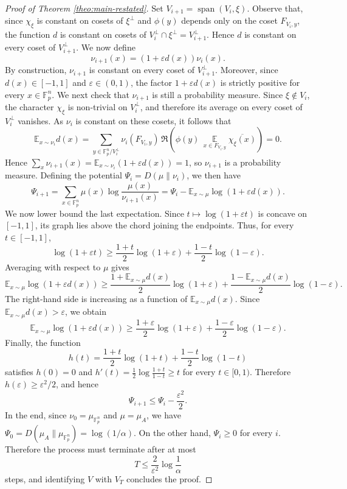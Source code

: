 \documentclass[11pt,reqno]{amsart}
\theoremstyle{plain}
\theoremstyle{remark}
\begin{document}
\begin{proof}[Proof of Theorem \ref{theo:main-restated}]
Set $V_{i+1}=\operatorname{span}(V_i,\xi)$. Observe that, since $\chi_\xi$ is constant on cosets of $\xi^\perp$ and $\phi(y)$ depends only on the coset $F_{V_i,y}$, the function $d$ is constant on cosets of $V_i^\perp\cap \xi^\perp = V_{i+1}^\perp$. Hence $d$ is constant on every coset of $V_{i+1}^\perp$. We now define
$$
\nu_{i+1}(x)=(1+\varepsilon d(x))\nu_i(x).
$$
By construction, $\nu_{i+1}$ is constant on every coset of $V_{i+1}^\perp$. Moreover, since $d(x)\in[-1,1]$ and $\varepsilon\in(0,1)$, the factor $1+\varepsilon d(x)$ is strictly positive for every $x\in\mathbb F_p^n$.
We next check that $\nu_{i+1}$ is still a probability measure. Since $\xi\notin V_i$, the character $\chi_\xi$ is non-trivial on $V_i^\perp$, and therefore its average on every coset of $V_i^\perp$ vanishes. As $\nu_i$ is constant on these cosets, it follows that
$$
\mathbb E_{x\sim\nu_i} d(x)
=
\sum_{y\in \mathbb F_p^n/V_i^\perp}
\nu_i(F_{V_i,y})\,
\Re\left(
\phi(y)\,
\mathop{\mathbb E}\limits_{x\in F_{V_i,y}} \overline{\chi_\xi(x)}
\right)
=
0.
$$
Hence $\sum_x \nu_{i+1}(x)=\mathbb E_{x\sim\nu_i}(1+\varepsilon d(x))=1$, so $\nu_{i+1}$ is a probability measure.
Defining the potential $\Psi_i=D(\mu\|\nu_i)$, we then have
$$
\Psi_{i+1}
=
\sum_{x\in\mathbb F_p^n}
\mu(x)\log\frac{\mu(x)}{\nu_{i+1}(x)}
=
\Psi_i-\mathbb E_{x\sim\mu}\log(1+\varepsilon d(x)).
$$
We now lower bound the last expectation. Since $t\mapsto\log(1+\varepsilon t)$ is concave on $[-1,1]$, its graph lies above the chord joining the endpoints. Thus, for every $t\in[-1,1]$,
$$
\log(1+\varepsilon t)
\geq
\frac{1+t}{2}\log(1+\varepsilon)
+
\frac{1-t}{2}\log(1-\varepsilon).
$$
Averaging with respect to $\mu$ gives
$$
\mathbb E_{x\sim\mu}\log(1+\varepsilon d(x))
\geq
\frac{1+\mathbb E_{x\sim\mu}d(x)}{2}\log(1+\varepsilon)
+
\frac{1-\mathbb E_{x\sim\mu}d(x)}{2}\log(1-\varepsilon).
$$
The right-hand side is increasing as a function of $\mathbb E_{x\sim\mu}d(x)$. Since $\mathbb E_{x\sim\mu}d(x)>\varepsilon$, we obtain
$$
\mathbb E_{x\sim\mu}\log(1+\varepsilon d(x))
\geq
\frac{1+\varepsilon}{2}\log(1+\varepsilon)
+
\frac{1-\varepsilon}{2}\log(1-\varepsilon).
$$
Finally, the function
$$
h(t)=\frac{1+t}{2}\log(1+t)+\frac{1-t}{2}\log(1-t)
$$
satisfies $h(0)=0$ and $h'(t)=\frac12\log\frac{1+t}{1-t}\geq t$ for every $t\in[0,1)$. Therefore $h(\varepsilon)\geq \varepsilon^2/2$, and hence
$$
\Psi_{i+1}\leq \Psi_i-\frac{\varepsilon^2}{2}.
$$
In the end, since $\nu_0=\mu_{\mathbb F_p^n}$ and $\mu=\mu_A$, we have $\Psi_0=D(\mu_A\|\mu_{\mathbb F_p^n})=\log(1/\alpha)$. On the other hand, $\Psi_i\geq0$ for every $i$. Therefore the process must terminate after at most
$$
T\leq \frac{2}{\varepsilon^2}\log\frac{1}{\alpha}
$$
steps, and identifying $V$ with $V_T$ concludes the proof.
\end{proof}
\end{document}
